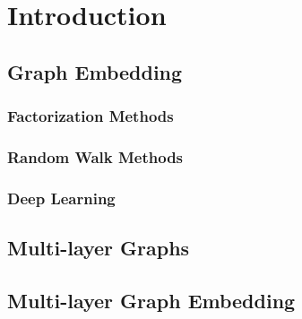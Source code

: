 \chapter{Introduction}

\label{chapter:introduction}



\section{Graph Embedding }



\subsection{Factorization Methods}
\subsection{Random Walk Methods}
\subsection{Deep Learning}

\section{Multi-layer Graphs}

\section{Multi-layer Graph Embedding}

%
%
%
%
%
%
%
%
